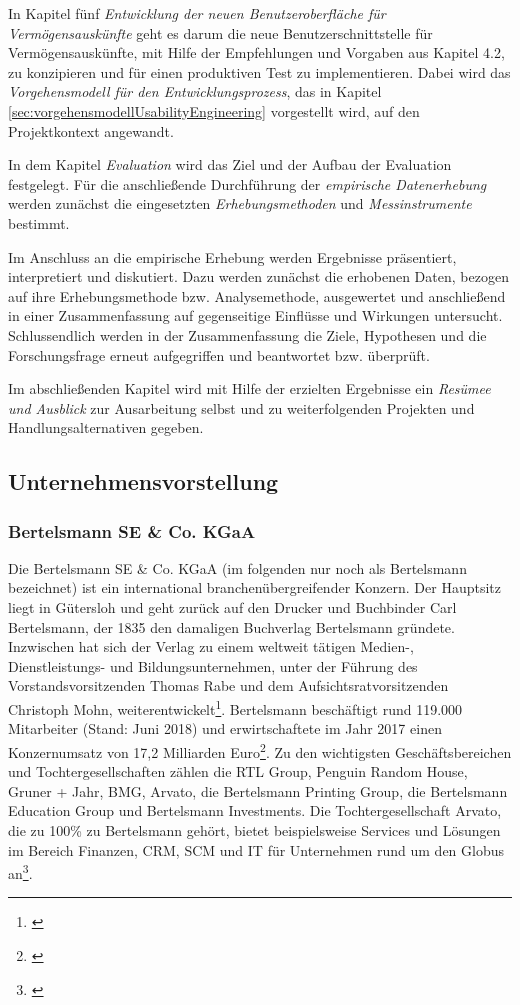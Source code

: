 In Kapitel fünf \textit{Entwicklung der neuen Benutzeroberfläche für Vermögensauskünfte} geht es darum die neue Benutzerschnittstelle für Vermögensauskünfte, mit Hilfe der Empfehlungen und Vorgaben aus Kapitel 4.2, zu konzipieren und für einen produktiven Test zu implementieren. Dabei wird das \textit{Vorgehensmodell für den Entwicklungsprozess}, das in Kapitel \ref{sec:vorgehensmodellUsabilityEngineering} vorgestellt wird, auf den Projektkontext angewandt.

In dem Kapitel \textit{Evaluation} wird das Ziel und der Aufbau der Evaluation festgelegt. Für die anschließende Durchführung der \textit{empirische Datenerhebung} werden zunächst die eingesetzten \textit{Erhebungsmethoden} und \textit{Messinstrumente} bestimmt.

Im Anschluss an die empirische Erhebung werden Ergebnisse präsentiert, interpretiert und diskutiert. Dazu werden zunächst die erhobenen Daten, bezogen auf ihre Erhebungsmethode bzw. Analysemethode, ausgewertet und anschließend in einer Zusammenfassung auf gegenseitige Einflüsse und Wirkungen untersucht. Schlussendlich werden in der Zusammenfassung die Ziele, Hypothesen und die Forschungsfrage erneut aufgegriffen und beantwortet bzw. überprüft.

Im abschließenden Kapitel wird mit Hilfe der erzielten Ergebnisse ein \textit{Resümee und Ausblick} zur Ausarbeitung selbst und zu weiterfolgenden Projekten und Handlungsalternativen gegeben.



\subsection{Unternehmensvorstellung}
\subsubsection{Bertelsmann SE \& Co. KGaA} Die Bertelsmann SE \& Co. KGaA (im folgenden nur noch als Bertelsmann bezeichnet) ist ein international branchenübergreifender Konzern. Der Hauptsitz liegt in Gütersloh und geht zurück auf den Drucker und Buchbinder Carl Bertelsmann, der 1835 den damaligen Buchverlag Bertelsmann gründete. Inzwischen hat sich der Verlag zu einem weltweit tätigen Medien-, Dienstleistungs- und Bildungsunternehmen, unter der Führung des Vorstandsvorsitzenden Thomas Rabe und dem Aufsichtsratvorsitzenden Christoph Mohn, weiterentwickelt\footnote{\cite{BertelsmannGeschaeftsbericht2016}}. Bertelsmann beschäftigt rund 119.000 Mitarbeiter (Stand: Juni 2018) und erwirtschaftete im Jahr 2017 einen Konzernumsatz von 17,2 Milliarden Euro\footnote{\cite{BertelsmannAufEinenBlick2018}}. Zu den wichtigsten Geschäftsbereichen und Tochtergesellschaften zählen die RTL Group, Penguin Random House, Gruner + Jahr, BMG, Arvato, die Bertelsmann Printing Group, die Bertelsmann Education Group und Bertelsmann Investments. Die Tochtergesellschaft Arvato, die zu 100\% zu Bertelsmann gehört, bietet beispielsweise Services und Lösungen im Bereich Finanzen, \gls{CRM}, \gls{SCM} und IT für Unternehmen rund um den Globus an\footnote{\cite{BertelsmannGeschaeftsbericht2016}}.

